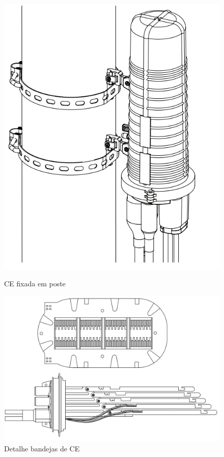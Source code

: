 \begin{figure}
  \begin{minipage}[c]{0.44\linewidth}
	\includegraphics[width=\linewidth]{./images/caixa_emenda_fixacao_em_poste.png}
	\caption{CE fixada em poste}
	\label{fig:ce_fixacao_poste}
  \end{minipage}
  \hfill
  \begin{minipage}[c]{0.5\linewidth}
	\includegraphics[width=\linewidth]{./images/caixa_emenda_detalhe_bandejas.png}
	\caption{Detalhe bandejas de CE}
	\label{fig:ce_detalhe_bandejas}
  \end{minipage}
\end{figure}


